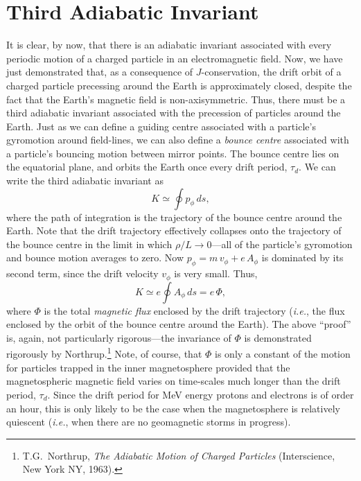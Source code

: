 \section{Third Adiabatic Invariant}
It is clear, by now, that there is an adiabatic invariant associated
with every periodic motion of a charged particle in 
an electromagnetic field.
Now, we have just demonstrated that, as a consequence of $J$-conservation,
the drift orbit of a charged particle precessing around the Earth is approximately
closed, despite the fact that the Earth's magnetic field is non-axisymmetric. 
Thus, there must be a third adiabatic invariant associated with the
precession of particles around the Earth. Just as we can define a
guiding centre associated with a particle's gyromotion around field-lines,
we can also define a {\em bounce centre}\/ associated with a particle's bouncing
motion between mirror points. The bounce centre lies on the equatorial plane, and
orbits the Earth once every drift period, $\tau_d$. 
 We can write the third adiabatic invariant as
\begin{equation}
K \simeq \oint p_\phi\,ds,
\end{equation}
where the path of integration is the trajectory of the bounce centre around
the Earth. Note that the drift trajectory
effectively collapses onto the trajectory of the bounce centre 
in the limit in which $\rho/L\rightarrow 0$---all
of the particle's gyromotion and bounce motion  averages to zero.
Now $p_\phi = m\,v_\phi + e\,A_\phi$ is dominated by its second term,
since the drift velocity $v_\phi$ is very small. Thus,
\begin{equation}
K \simeq e\oint A_\phi\,ds = e\,{\Phi},
\end{equation}
where ${ \Phi}$ is the total {\em magnetic flux}\/ enclosed by the drift
trajectory ({\em i.e.}, the flux enclosed by the orbit of the bounce centre
around the Earth). The above ``proof'' is, again, not particularly rigorous---the invariance of ${\Phi}$ is demonstrated rigorously by Northrup.\footnote{
T.G.~Northrup, {\em The Adiabatic Motion of Charged Particles} (Interscience,
New York NY, 1963).} Note, of course, that ${\Phi}$ is only a constant
of the motion for particles trapped in the inner magnetosphere provided that the
magnetospheric magnetic field varies on time-scales much longer than
the drift period, $\tau_d$. Since the drift period for MeV energy 
protons and electrons is of order an hour, this is only likely
to be the case when the magnetosphere is relatively quiescent ({\em i.e.},
when there are no geomagnetic storms in progress). 

